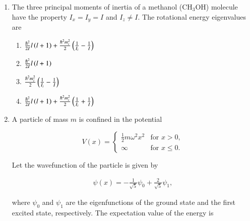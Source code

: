 \documentclass[journal]{IEEEtran}
\begin{document}
\begin{enumerate}[start=27]
\item The three principal moments of inertia of a methanol (CH$_3$OH) molecule have the property $I_x = I_y = I$ and $I_z \neq I$. The rotational energy eigenvalues are
\begin{multicols}{2}
\begin{enumerate}
    \item $\frac{\hbar^2}{2I}l\left(l+1\right) + \frac{\hbar^2 m_i^2}{2}\left(\frac{1}{I_i} - \frac{1}{I}\right)$\\
    \item $\frac{\hbar^2}{2I}l\left(l+1\right)$
    \item $\frac{\hbar^2 m_i^2}{2}\left(\frac{1}{I_i} - \frac{1}{I}\right)$\\
    \item $\frac{\hbar^2}{2I}l\left(l+1\right) + \frac{\hbar^2 m_i^2}{2}\left(\frac{1}{I_i} + \frac{1}{I}\right)$
\end{enumerate}
\end{multicols}
\item A particle of mass $m$ is confined in the potential 

\begin{equation*}
V(x) = \begin{cases}
\frac{1}{2}m\omega^2 x^2 & \text{for } x > 0, \\
\infty & \text{for } x \leq 0.
\end{cases}
\end{equation*}

Let the wavefunction of the particle is given by

\begin{align*}
\psi(x) = -\frac{1}{\sqrt{5}}\psi_0 + \frac{2}{\sqrt{5}}\psi_1,
\end{align*}

where $\psi_0$ and $\psi_1$ are the eigenfunctions of the ground state and the first excited state, respectively. The expectation value of the energy is
\begin{figure}[H]
\centering
{}%
\label{fig:my_label}
\end{figure}


\end{enumerate}
\end{document}
